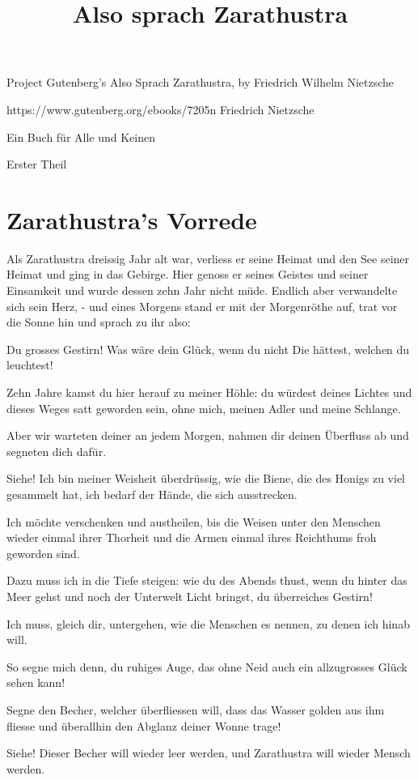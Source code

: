 \documentclass{book}
\begin{document}
  Project Gutenberg's Also Sprach Zarathustra, by Friedrich Wilhelm Nietzsche

https://www.gutenberg.org/ebooks/7205n
  Friedrich Nietzsche
\title{Also sprach Zarathustra}

  Ein Buch für Alle und Keinen



  Erster Theil

  \chapter{Zarathustra's Vorrede}

  Als Zarathustra dreissig Jahr alt war, verliess er seine Heimat und den See seiner Heimat und ging in das Gebirge. Hier genoss er seines Geistes und
  seiner Einsamkeit und wurde dessen zehn Jahr nicht müde. Endlich aber verwandelte sich sein Herz, - und eines Morgens stand er mit der Morgenröthe
  auf, trat vor die Sonne hin und sprach zu ihr also:

  \begin{displayquote}
    Du grosses Gestirn! Was wäre dein Glück, wenn du nicht Die hättest, welchen du leuchtest!

    Zehn Jahre kamst du hier herauf zu meiner Höhle: du würdest deines Lichtes und dieses Weges satt geworden sein, ohne mich, meinen Adler und meine
    Schlange.

    Aber wir warteten deiner an jedem Morgen, nahmen dir deinen Überfluss ab und segneten dich dafür.

    Siehe! Ich bin meiner Weisheit überdrüssig, wie die Biene, die des Honigs zu viel gesammelt hat, ich bedarf der Hände, die sich ausstrecken.

    Ich möchte verschenken und austheilen, bis die Weisen unter den Menschen wieder einmal ihrer Thorheit und die Armen einmal ihres Reichthums froh
    geworden sind.

    Dazu muss ich in die Tiefe steigen: wie du des Abends thust, wenn du hinter das Meer gehst und noch der Unterwelt Licht bringst, du überreiches
    Gestirn!

    Ich muss, gleich dir, untergehen, wie die Menschen es nennen, zu denen ich hinab will.

    So segne mich denn, du ruhiges Auge, das ohne Neid auch ein allzugrosses Glück sehen kann!

    Segne den Becher, welcher überfliessen will, dass das Wasser golden aus ihm fliesse und überallhin den Abglanz deiner Wonne trage!

    Siehe! Dieser Becher will wieder leer werden, und Zarathustra will wieder Mensch werden.
  \end{displayquote}
\end{document}

